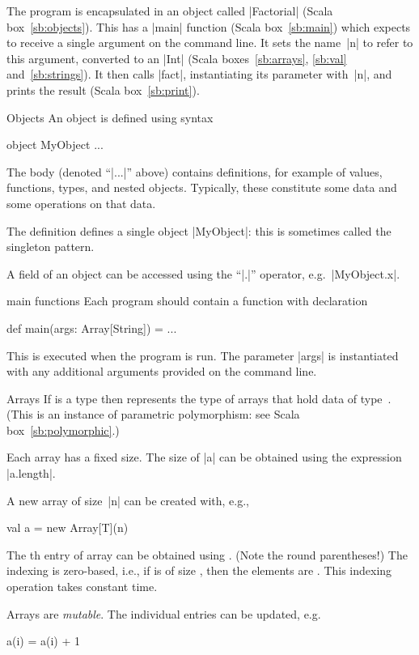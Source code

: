 \pagebreak[3]

The program is encapsulated in an object called |Factorial| (Scala
box~\ref{sb:objects}).  This has a |main| function (Scala box~\ref{sb:main})
which expects to receive a single argument on the command line.  It sets the
name~|n| to refer to this argument, converted to an |Int| (Scala
boxes~\ref{sb:arrays}, \ref{sb:val} and~\ref{sb:strings}).  It then calls
|fact|, instantiating its parameter with~|n|, and prints the result (Scala
box~\ref{sb:print}).


\begin{scalaBox}{Objects}
\label{sb:objects}
An object is defined using syntax
\begin{scala}
  object MyObject{ ... }
\end{scala}
%
The body (denoted ``|...|'' above) contains definitions, for example of
values, functions, types, and nested objects.  Typically, these constitute
some data and some operations on that data.

The definition defines a single object |MyObject|: this is sometimes called
the singleton pattern.

A field of an object can be accessed using the ``|.|'' operator,
e.g.~|MyObject.x|. 
\end{scalaBox}


\begin{scalaBox}{{\scalashape main} functions}
\label{sb:main}
Each program should contain a function with declaration
\begin{scala}
  def main(args: Array[String]) = ...
\end{scala}
This is  executed when the program is run.  The parameter |args| is
instantiated with any additional arguments provided on the command line.
\end{scalaBox}


\begin{scalaBox}{Arrays}
\label{sb:arrays}
If  is a type then  represents the type of arrays
that hold data of type~.  (This is an instance of parametric
polymorphism: see Scala box~\ref{sb:polymorphic}.)

Each array has a fixed size. The size of |a| can be obtained using the
expression |a.length|.

A new array of size~|n| can be created with, e.g.,
\begin{scala}
  val a = new Array[T](n)
\end{scala}

The th entry of array  can be obtained using .
(Note the round parentheses!)  The indexing is zero-based, i.e., if 
is of size , then the elements are .  This
indexing operation takes constant time.  

Arrays are \emph{mutable}.  The individual entries can be updated, e.g.
\begin{scala}
  a(i) = a(i) + 1
\end{scala}
\end{scalaBox}

